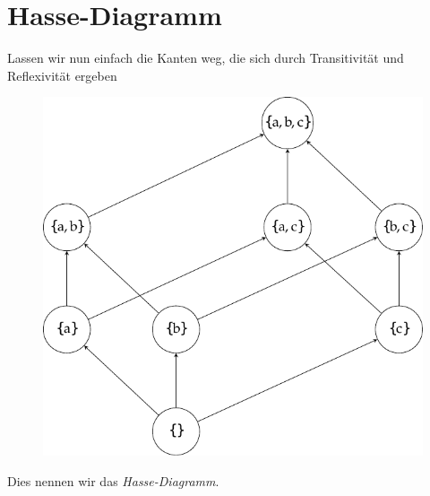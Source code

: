 \section{Hasse-Diagramm}
\begin{frame}
Lassen wir nun einfach die Kanten weg, die sich durch Transitivität und Reflexivität ergeben \pause
\begin{figure}[H]
	\centering
	\includegraphics[scale=0.65]{../figures/halbordnungen/Hasse1.pdf}
\end{figure} \pause
Dies nennen wir das \emph{Hasse-Diagramm}.
\end{frame}

